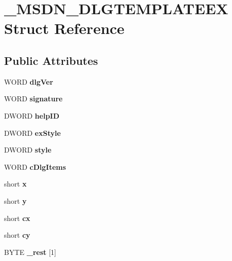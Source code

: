 \hypertarget{struct__MSDN__DLGTEMPLATEEX}{}\section{\+\_\+\+M\+S\+D\+N\+\_\+\+D\+L\+G\+T\+E\+M\+P\+L\+A\+T\+E\+EX Struct Reference}
\label{struct__MSDN__DLGTEMPLATEEX}
\subsection*{Public Attributes}
\begin{DoxyCompactItemize}
\item 
\mbox{\label{struct__MSDN__DLGTEMPLATEEX_a851b8873cfb8a222b7b31982e5693cfe}} 
W\+O\+RD {\bfseries dlg\+Ver}
\item 
\mbox{\label{struct__MSDN__DLGTEMPLATEEX_ae23dd594822b4bd469c34f5b0d8c4d31}} 
W\+O\+RD {\bfseries signature}
\item 
\mbox{\label{struct__MSDN__DLGTEMPLATEEX_a226039f789b55667249c420729dff08e}} 
D\+W\+O\+RD {\bfseries help\+ID}
\item 
\mbox{\label{struct__MSDN__DLGTEMPLATEEX_a014ceddaa5fc5252d78272e86a6ed9eb}} 
D\+W\+O\+RD {\bfseries ex\+Style}
\item 
\mbox{\label{struct__MSDN__DLGTEMPLATEEX_a345dcafc3daeeab66234432a938d1002}} 
D\+W\+O\+RD {\bfseries style}
\item 
\mbox{\label{struct__MSDN__DLGTEMPLATEEX_a5bef48f0bb704e4c6ab9c8c33a834d10}} 
W\+O\+RD {\bfseries c\+Dlg\+Items}
\item 
\mbox{\label{struct__MSDN__DLGTEMPLATEEX_adc9666451f0e9858827f41eead2b1793}} 
short {\bfseries x}
\item 
\mbox{\label{struct__MSDN__DLGTEMPLATEEX_abca80e1e6b67d38b2889dd56c6d693fb}} 
short {\bfseries y}
\item 
\mbox{\label{struct__MSDN__DLGTEMPLATEEX_a9f70753830bc59a0799f1f03b20bd4f0}} 
short {\bfseries cx}
\item 
\mbox{\label{struct__MSDN__DLGTEMPLATEEX_a7147bcb227f0e49a97dcf0c8ef627773}} 
short {\bfseries cy}
\item 
\mbox{\label{struct__MSDN__DLGTEMPLATEEX_a77bd085116e4c2823421d42b454f8469}} 
B\+Y\+TE {\bfseries \+\_\+rest} \mbox{[}1\mbox{]}
\end{DoxyCompactItemize}


